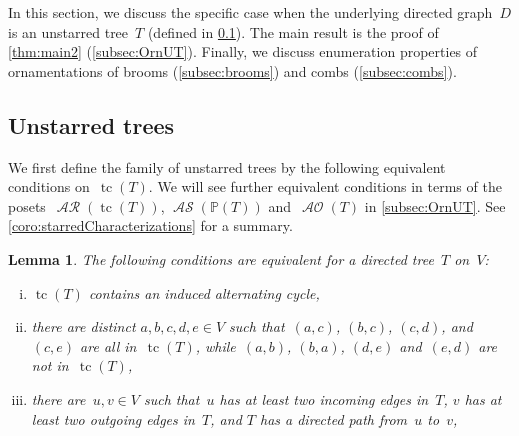 \documentclass{amsart}
\newtheorem{lemma}[theorem]{Lemma}
\theoremstyle{definition}
\renewcommand{\c}[1]{\mathcal{#1}} %
\DeclareMathOperator{\tc}{tc} %
\DeclareMathOperator{\AOrn}{\c{AO}}  %
\DeclareMathOperator{\AReori}{\c{AR}}  %
\DeclareMathOperator{\ASour}{\mathcal{AS}}  %
\newcommand{\PP}{\mathbb P} %
\begin{document}
In this section, we discuss the specific case when the underlying directed graph~$D$ is an unstarred tree~$T$ (defined in \cref{subsec:unstarredTrees}).
The main result is the proof of \cref{thm:main2} (\cref{subsec:OrnUT}).
Finally, we discuss enumeration properties of ornamentations of brooms (\cref{subsec:brooms}) and combs (\cref{subsec:combs}).


\subsection{Unstarred trees}
\label{subsec:unstarredTrees}


We first define the family of unstarred trees by the following equivalent conditions on~$\tc(T)$.
We will see further equivalent conditions in terms of the posets~$\AReori(\tc(T))$, $\ASour(\PP(T))$ and~$\AOrn(T)$ in \cref{subsec:OrnUT}.
See \cref{coro:starredCharacterizations} for a summary.

\begin{lemma}
\label{lem:starredCharacterization}
The following conditions are equivalent for a directed tree~$T$ on~$V$:
\begin{enumerate}[(i)]
\item $\tc(T)$ contains an induced alternating cycle,
\item there are distinct $a,b,c,d,e \in V$ such that~$(a,c)$, $(b,c)$, $(c,d)$, and~$(c,e)$ are all in~$\tc(T)$, while~$(a,b)$, $(b,a)$, $(d,e)$ and~$(e,d)$ are not in~$\tc(T)$,
\item there are~$u,v \in V$ such that~$u$ has at least two incoming edges in~$T$, $v$ has at least two outgoing edges in~$T$, and $T$ has a directed path from~$u$ to~$v$,
\end{enumerate}
\end{lemma}
\end{document}
